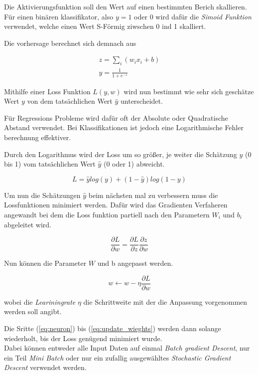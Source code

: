Die Aktivierungsfunktion soll den Wert auf einen bestimmten Berich skallieren.
Für einen binären klassifikator, also $y = 1$ oder $0$ wird dafür die 
\textit{Simoid Funktion} verwendet, welche einen Wert S-Förmig ziwschen 0 ind 1 
skalliert. 

Die vorhersage berechnet sich demnach aus 

\begin{align}
    \label{eq:neuron}
    z = \sum_{i}(w_{i}x_{i} + b)\\
    y = \frac{1}{1 + e^{-z}}
\end{align}

Mithilfe einer Loss Funktion $L(y,w)$ wird nun bestimmt wie sehr sich geschätze 
Wert $y$ von dem tatsächlichen Wert $\hat{y}$ unterscheidet.

Für Regressions Probleme wird dafür oft der Absolute oder Quadratische Abstand
verwendet. Bei Klassifikationen ist jedoch eine Logarithmische Fehler berechnung 
effektiver.

Durch den Logarithmus wird der Loss um so größer, je weiter die Schätzung $y$ (0 bis 1) vom 
tatsächlichen Wert $\hat{y}$ (0 oder 1) abweicht. 

\begin{equation}
    \label{eq:crossentropy}
    L = \hat{y}log(y) + (1 - \hat{y})log(1 - y)
\end{equation}


Um nun die Schätzungen $\hat{y}$ beim nächsten mal zu verbessern muss die 
Lossfunktionen minimiert werden. Dafür wird das Gradienten Verfaheren angewandt 
bei dem die Loss funktion partiell nach den Parametern $W_{i}$ und $b_{i}$ 
abgeleitet wird.

\begin{equation}
    \label{eq:grad}
    \frac{\partial L}{\partial w} = \frac{\partial L}{\partial z}\frac{\partial z}{\partial w}
\end{equation}

Nun können die Parameter $W$ und b angepasst werden.

\begin{equation}
    \label{eq:update_wieghts}
    w  \leftarrow w - \eta \frac{\partial L}{\partial w}
\end{equation}

wobei die \textit{Leariningrate} $\eta$ die Schrittweite mit der die Anpassung vorgenommen
werden soll angibt.

Die Sritte (\ref{eq:neuron}) bis (\ref{eq:update_wieghts}) werden dann solange wiederholt, 
bis der Loss genügend minimiert wurde.
\\
Dabei können entweder alle Input Daten auf einmal \textit{Batch 
gradient Descent}, nur ein Teil \textit{Mini Batch} oder nur 
ein zufallig ausgewähltes \textit{Stochastic Gradient 
Descent} verwendet werden.



